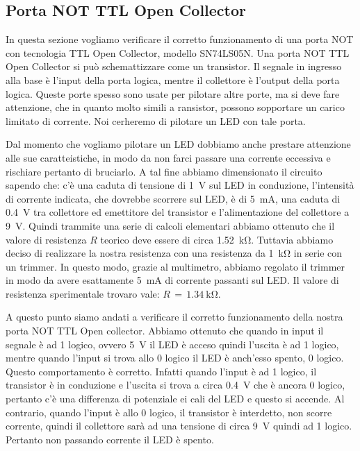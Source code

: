 \subsection*{Porta NOT TTL Open Collector}

In questa sezione vogliamo verificare il corretto funzionamento di una porta NOT con tecnologia TTL Open Collector, modello SN74LS05N. Una porta NOT TTL Open Collector si può schemattizzare come un transistor. Il segnale in ingresso alla base è l'input della porta logica, mentre il collettore è l'output della porta logica. Queste porte spesso sono usate per pilotare altre porte, ma si deve fare attenzione, che in quanto molto simili a ransistor, possono sopportare un carico limitato di corrente. Noi cerheremo di pilotare un LED con tale porta.

Dal momento che vogliamo pilotare un LED dobbiamo anche prestare attenzione alle sue caratteistiche, in modo da non farci passare una corrente eccessiva e rischiare pertanto di bruciarlo. A tal fine abbiamo dimensionato il circuito sapendo che: c'è una caduta di tensione di \SI{1}{\volt} sul LED in conduzione, l'intensità di corrente indicata, che dovrebbe scorrere sul LED, è di \SI{5}{\milli\ampere}, una caduta di \SI{0.4}{\volt} tra collettore ed emettitore del transistor e l'alimentazione del collettore a \SI{+9}{\volt}. Quindi trammite una serie di calcoli elementari abbiamo ottenuto che il valore di resistenza $R$ teorico deve essere di circa \SI{1.52}{\kilo\ohm}. Tuttavia abbiamo deciso di realizzare la nostra resistenza con una resistenza da \SI{1}{\kilo\ohm} in serie con un trimmer. In questo modo, grazie al multimetro, abbiamo regolato il trimmer in modo da avere esattamente \SI{5}{\milli\ampere} di corrente passanti sul LED. Il valore di resistenza sperimentale trovaro vale: $R\,=\,\SI{1.34}{\kilo\ohm}$.

A questo punto siamo andati a verificare il corretto funzionamento della nostra porta NOT TTL Open collector. Abbiamo ottenuto che quando in input il segnale è ad 1 logico, ovvero \SI{5}{\volt} il LED è acceso quindi l'uscita è ad 1 logico, mentre quando l'input si trova allo 0 logico il LED è anch'esso spento, 0 logico.
Questo comportamento è corretto. Infatti quando l'input è ad 1 logico, il transistor è in conduzione e l'uscita si trova a circa \SI{0.4}{\volt} che è ancora 0 logico, pertanto c'è una differenza di potenziale ei cali del LED e questo si accende. Al contrario, quando l'input è allo 0 logico, il transistor è interdetto, non scorre corrente, quindi il collettore sarà ad una tensione di circa \SI{9}{\volt} quindi ad 1 logico. Pertanto non passando corrente il LED è spento.

